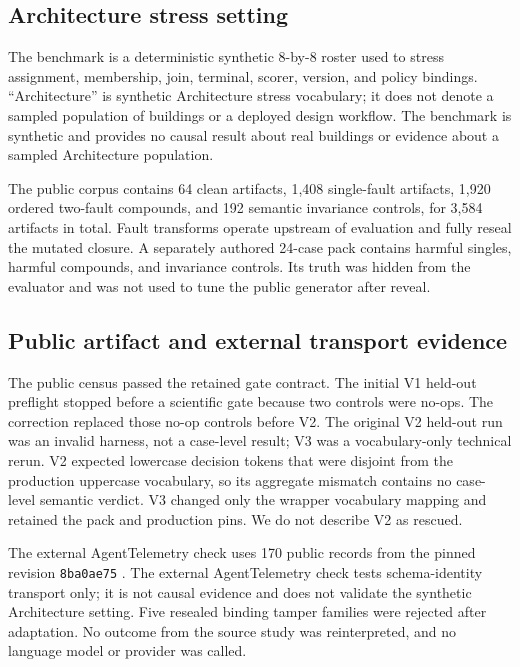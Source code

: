 \documentclass{article}
\begin{document}
\subsection{Architecture stress setting}

The benchmark is a deterministic synthetic 8-by-8 roster used to stress assignment, membership, join, terminal, scorer, version, and policy bindings. ``Architecture'' is synthetic Architecture stress vocabulary; it does not denote a sampled population of buildings or a deployed design workflow. The benchmark is synthetic and provides no causal result about real buildings or evidence about a sampled Architecture population.

The public corpus contains 64 clean artifacts, 1,408 single-fault artifacts, 1,920 ordered two-fault compounds, and 192 semantic invariance controls, for 3,584 artifacts in total. Fault transforms operate upstream of evaluation and fully reseal the mutated closure. A separately authored 24-case pack contains harmful singles, harmful compounds, and invariance controls. Its truth was hidden from the evaluator and was not used to tune the public generator after reveal.

\subsection{Public artifact and external transport evidence}

The public census passed the retained gate contract. The initial V1 held-out preflight stopped before a scientific gate because two controls were no-ops. The correction replaced those no-op controls before V2. The original V2 held-out run was an invalid harness, not a case-level result; V3 was a vocabulary-only technical rerun. V2 expected lowercase decision tokens that were disjoint from the production uppercase vocabulary, so its aggregate mismatch contains no case-level semantic verdict. V3 changed only the wrapper vocabulary mapping and retained the pack and production pins. We do not describe V2 as rescued.

The external AgentTelemetry check uses 170 public records from the pinned revision \texttt{8ba0ae75} \citep{agenttelemetry2026}. The external AgentTelemetry check tests schema-identity transport only; it is not causal evidence and does not validate the synthetic Architecture setting. Five resealed binding tamper families were rejected after adaptation. No outcome from the source study was reinterpreted, and no language model or provider was called.
\end{document}
